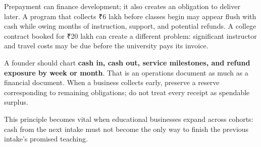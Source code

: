 Prepayment can finance development; it also creates an obligation to deliver later. A program that collects ₹6 lakh before classes begin may appear flush with cash while owing months of instruction, support, and potential refunds. A college contract booked for ₹20 lakh can create a different problem: significant instructor and travel costs may be due before the university pays its invoice.

A founder should chart \textbf{cash in, cash out, service milestones, and refund exposure by week or month}. That is an operations document as much as a financial document. When a business collects early, preserve a reserve corresponding to remaining obligations; do not treat every receipt as spendable surplus.

This principle becomes vital when educational businesses expand across cohorts: cash from the next intake must not become the only way to finish the previous intake's promised teaching.
